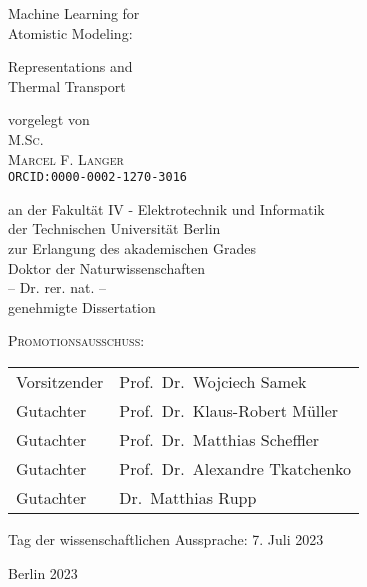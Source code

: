 \begin{titlepage}
\begin{center}

\vfill

\vspace{1.5cm}

{\Huge Machine Learning for \\Atomistic Modeling:}

\vspace{0.4cm} 

{\Huge Representations and \\Thermal Transport}

\vspace{1.5cm}

\Large
vorgelegt von \\
\vspace{0.3cm}
{\textsc{M.Sc.}}\\
{\LARGE\textsc{Marcel F. Langer}} \\
{\small \texttt{ORCID:0000-0002-1270-3016}}

\vspace{1.5cm}


an der Fakultät IV - Elektrotechnik und Informatik\\
der Technischen Universität Berlin\\
zur Erlangung des akademischen Grades\\
Doktor der Naturwissenschaften\\
-- Dr. rer. nat. --\\
genehmigte Dissertation

\vspace{1.0cm}
\textsc{Promotionsausschuss:}\\
\vspace{0.5cm}
\begin{tabular}{l l}
    Vorsitzender & Prof.~Dr.~Wojciech Samek\\
    Gutachter & Prof.~Dr.~Klaus-Robert Müller \\
    Gutachter & Prof.~Dr.~Matthias Scheffler \\
    Gutachter & Prof.~Dr.~Alexandre Tkatchenko \\
    Gutachter & Dr.~Matthias Rupp \\
\end{tabular}

\vspace{0.75cm}

Tag der wissenschaftlichen Aussprache: 7. Juli 2023

\vspace{1.25cm}

Berlin 2023

\end{center}
\end{titlepage}
\restoregeometry